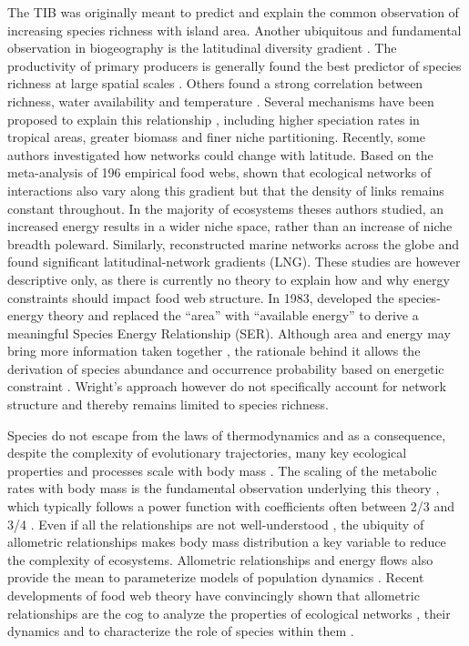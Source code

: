 The TIB was originally meant to predict and explain the common
observation of increasing species richness with island area. Another
ubiquitous and fundamental observation in biogeography is the
latitudinal diversity gradient
\citep[LDG,][]{Rhode1992, Stevens1989, Evans2005}. The productivity of
primary producers is generally found the best predictor of species
richness at large spatial scales \citep{Evans2005, Storch2005}. Others
found a strong correlation between richness, water availability and
temperature \citep{Currie1993, Hawkins2003}. Several mechanisms have
been proposed to explain this relationship \citep[see][ for a
review]{Currie2004, Evans2005}, including higher speciation rates in
tropical areas, greater biomass and finer niche partitioning. Recently,
some authors investigated how networks could change with latitude. Based
on the meta-analysis of 196 empirical food webs, \citet{Cirtwill2015a}
shown that ecological networks of interactions also vary along this
gradient but that the density of links remains constant throughout. In
the majority of ecosystems theses authors studied, an increased energy
results in a wider niche space, rather than an increase of niche breadth
poleward. Similarly, \citet{Albouy2016} reconstructed marine networks
across the globe and found significant latitudinal-network gradients
(LNG). These studies are however descriptive only, as there is currently
no theory to explain how and why energy constraints should impact food
web structure. In 1983, \citet{Wright1983} developed the species-energy
theory and replaced the ``area'' with ``available energy'' to derive a
meaningful Species Energy Relationship (SER). Although area and energy
may bring more information taken together \citep{Storch2005}, the
rationale behind it allows the derivation of species abundance and
occurrence probability based on energetic constraint \citep{Wright1983}.
Wright's approach however do not specifically account for network
structure and thereby remains limited to species richness.

Species do not escape from the laws of thermodynamics and as a
consequence, despite the complexity of evolutionary trajectories, many
key ecological properties and processes scale with body mass
\citep[\emph{i.e.} metabolic theory of
ecology][]{Brown2004, Woodward2005a}. The scaling of the metabolic rates
with body mass is the fundamental observation underlying this theory
\citep{Gillooly2001}, which typically follows a power function with
coefficients often between 2/3 and 3/4 \citep{White2013}. Even if all
the relationships are not well-understood \citep[see the case of
abundances reviewed in][ and the recent relationship between prey and
predator biomasses \citet{Hatton2015}]{White2007}, the ubiquity of
allometric relationships makes body mass distribution a key variable to
reduce the complexity of ecosystems. Allometric relationships and energy
flows also provide the mean to parameterize models of population
dynamics \citep{Yodzis1992}. Recent developments of food web theory have
convincingly shown that allometric relationships are the cog to analyze
the properties of ecological networks \citep{Gravel2013, Petchey2008},
their dynamics \citep{Brose2006} and to characterize the role of species
within them \citep{Schneider2012}.

